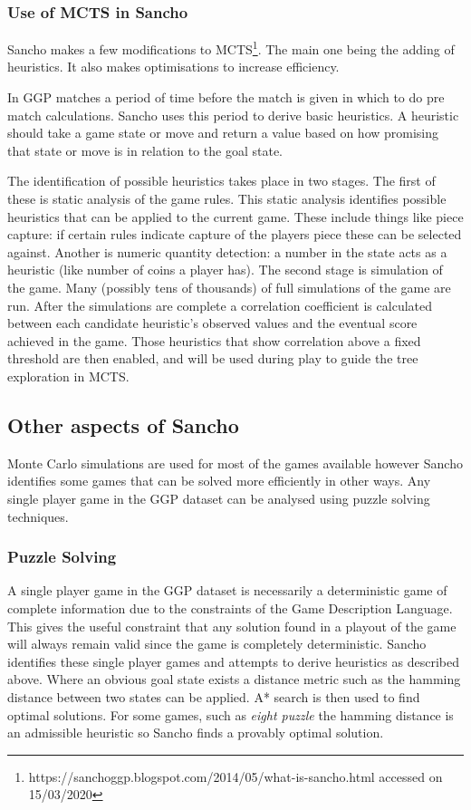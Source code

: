 \subsubsection{Use of MCTS in Sancho}

Sancho makes a few modifications to MCTS\footnote{https://sanchoggp.blogspot.com/2014/05/what-is-sancho.html accessed on 15/03/2020}. The main one being the adding of heuristics. It also makes optimisations to increase efficiency.

In GGP matches a period of time before the match is given in which to do pre match calculations. Sancho uses this period to derive basic heuristics. A heuristic should take a game state or move and return a value based on how promising that state or move is in relation to the goal state. 

The identification of possible heuristics takes place in two stages. The first of these is static analysis of the game rules. This static analysis identifies possible heuristics that can be applied to the current game. These include things like piece capture: if certain rules indicate capture of the players piece these can be selected against. Another is numeric quantity detection: a number in the state acts as a heuristic (like number of coins a player has). The second stage is simulation of the game. Many (possibly tens of thousands) of full simulations of the game are run. After the simulations are complete a correlation coefficient is calculated between each candidate heuristic's observed values and the eventual score achieved in the game. Those heuristics that show correlation above a fixed threshold are then enabled, and will be used during play to guide the tree exploration in MCTS.

\subsection{Other aspects of Sancho}

Monte Carlo simulations are used for most of the games available however Sancho identifies some games that can be solved more efficiently in other ways. Any single player game in the GGP dataset can be analysed using puzzle solving techniques.
\subsubsection{Puzzle Solving}
A single player game in the GGP dataset is necessarily a deterministic game of complete information due to the constraints of the Game Description Language. This gives the useful constraint that any solution found in a playout of the game will always remain valid since the game is completely deterministic. Sancho identifies these single player games and attempts to derive heuristics as described above. Where an obvious goal state exists a distance metric such as the hamming distance between two states can be applied. A* search is then used to find optimal solutions. For some games, such as \textit{eight puzzle} the hamming distance is an admissible heuristic so Sancho finds a provably optimal solution.

